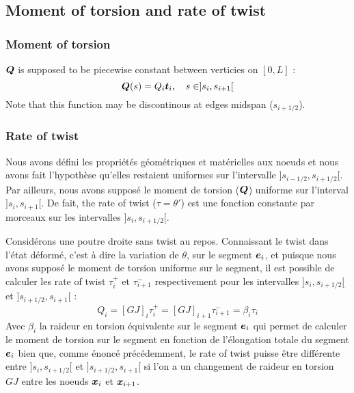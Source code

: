 \subsection{Moment of torsion and rate of twist}

\subsubsection{Moment of torsion}
$\boldsymbol{Q}$ is supposed to be piecewise constant between verticies on $[0,L]$ :
\begin{equation}
	\boldsymbol{Q}(s) = Q_i \boldsymbol{t}_i , \quad s \in ]s_i,s_{i+1}[
\end{equation}
Note that this function may be discontinous at edges midspan ($s_{i+1/2}$).

\subsubsection{Rate of twist}
Nous avons défini les propriétés géométriques et matérielles aux noeuds et nous avons fait l'hypothèse qu'elles restaient uniformes sur l'intervalle $]s_{i-1/2},s_{i+1/2}[$. Par ailleurs, nous avons supposé le moment de torsion ($\boldsymbol{Q}$) uniforme sur l'interval  $]s_i,s_{i+1}[$.
De fait, the rate of twist ($\tau = \theta'$) est une fonction constante par morceaux sur les intervalles $]s_i,s_{i+1/2}[$.

Considérons une poutre droite sans twist au repos. Connaissant le twist dans l'état déformé, c'est à dire la variation de $\theta$, sur le segment $\boldsymbol{e}_i$, et puisque nous avons supposé le moment de torsion uniforme sur le segment, il est possible de calculer les rate of twist $\tau_{i}^{+}$ et $\tau_{i+1}^{-}$ respectivement pour les intervalles $]s_i,s_{i+1/2}[$ et $]s_{i+1/2},s_{i+1}[$ :
\begin{equation}
	Q_i = [GJ]_{i} \tau_{i}^{+}
	= [GJ]_{i+1} \tau_{i+1}^{-}
	= \beta_i \tau_i
\end{equation}
Avec $\beta_i$ la raideur en torsion équivalente sur le segment $\boldsymbol{e}_i$ qui permet de calculer le moment de torsion sur le segment en fonction de l'élongation totale du segment $\boldsymbol{e}_i$ bien que, comme énoncé précédemment, le rate of twist puisse être différente entre $]s_i,s_{i+1/2}[$ et $]s_{i+1/2},s_{i+1}[$ si l'on a un changement de raideur en torsion $GJ$ entre les noeuds $\boldsymbol{x}_i$ et $\boldsymbol{x}_{i+1}$.

